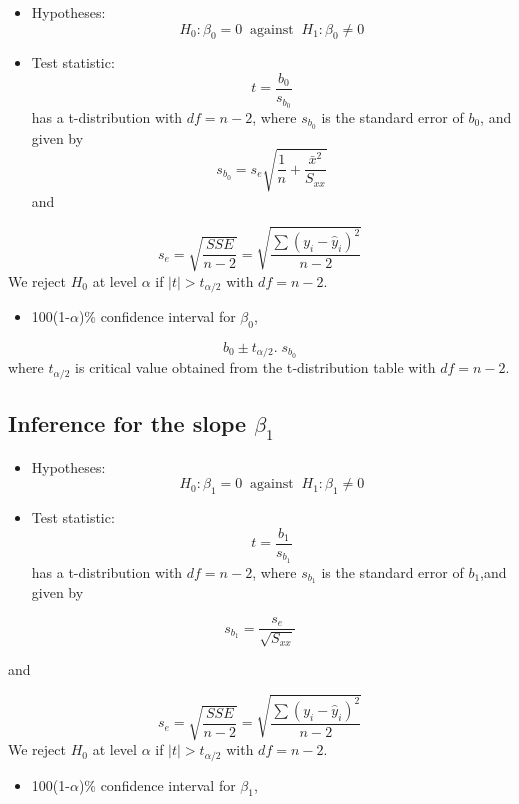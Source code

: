 \documentclass[
]{article}
\providecommand{\tightlist}{%
  \setlength{\itemsep}{0pt}\setlength{\parskip}{0pt}}
\begin{document}
\begin{itemize}
\item
  Hypotheses:\[H_0:\beta_0=0\;\; \text{against}\;\; H_1:\beta_0\neq 0\]
\item
  Test statistic: \[t=\frac{b_0}{s_{b_0}}\] has a t-distribution with
  \(df=n-2\), where \(s_{b_0}\) is the standard error of \(b_0\), and
  given by \[s_{b_0}=s_e\sqrt{\frac{1}{n}+\frac{\bar{x}^2}{S_{xx}}}\]
  and
\end{itemize}

\[s_e=\sqrt{\frac{SSE}{n-2}}=\sqrt{\frac{\sum(y_i-\hat{y}_i)^2}{n-2}}\]
We reject \(H_0\) at level \(\alpha\) if \(|t|>t_{\alpha/2}\) with
\(df=n-2\).

\begin{itemize}
\tightlist
\item
  100(1-\(\alpha\))\% confidence interval for \(\beta_0\),
\end{itemize}

\[b_0 \pm t_{\alpha/2} .\;s_{b_0}\] where \(t_{\alpha/2}\) is critical
value obtained from the t‐distribution table with \(df=n-2\).

\hypertarget{inference-for-the-slope-beta_1}{%
\subsection{\texorpdfstring{Inference for the slope
\(\beta_1\)}{Inference for the slope \textbackslash beta\_1}}\label{inference-for-the-slope-beta_1}}

\begin{itemize}
\item
  Hypotheses: \[H_0:\beta_1=0\;\; \text{against}\;\; H_1:\beta_1\neq 0\]
\item
  Test statistic: \[t=\frac{b_1}{s_{b_1}}\] has a t-distribution with
  \(df=n-2\), where \(s_{b_1}\) is the standard error of \(b_1\),and
  given by
\end{itemize}

\[s_{b_1}=\frac{s_e}{\sqrt{S_{xx}}}\]

and

\[s_e=\sqrt{\frac{SSE}{n-2}}=\sqrt{\frac{\sum(y_i-\hat{y}_i)^2}{n-2}}\]
We reject \(H_0\) at level \(\alpha\) if \(|t|>t_{\alpha/2}\) with
\(df=n-2\).

\begin{itemize}
\tightlist
\item
  100(1-\(\alpha\))\% confidence interval for \(\beta_1\),
\end{itemize}
\end{document}
